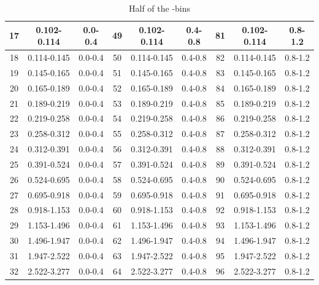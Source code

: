 \begin{table}[]
\begin{center}
\begin{tabular}{|c|c|c|c|c|c|c|c|c|}
 17 & 0.102-0.114 & 0.0-0.4 & 49 & 0.102-0.114 & 0.4-0.8 & 81 & 0.102-0.114 & 0.8-1.2 \\ \hline
 18 & 0.114-0.145 & 0.0-0.4 & 50 & 0.114-0.145 & 0.4-0.8 & 82 & 0.114-0.145 & 0.8-1.2 \\ \hline
 19 & 0.145-0.165 & 0.0-0.4 & 51 & 0.145-0.165 & 0.4-0.8 & 83 & 0.145-0.165 & 0.8-1.2 \\ \hline
 20 & 0.165-0.189 & 0.0-0.4 & 52 & 0.165-0.189 & 0.4-0.8 & 84 & 0.165-0.189 & 0.8-1.2 \\ \hline
 21 & 0.189-0.219 & 0.0-0.4 & 53 & 0.189-0.219 & 0.4-0.8 & 85 & 0.189-0.219 & 0.8-1.2 \\ \hline
 22 & 0.219-0.258 & 0.0-0.4 & 54 & 0.219-0.258 & 0.4-0.8 & 86 & 0.219-0.258 & 0.8-1.2 \\ \hline
 23 & 0.258-0.312 & 0.0-0.4 & 55 & 0.258-0.312 & 0.4-0.8 & 87 & 0.258-0.312 & 0.8-1.2 \\ \hline
 24 & 0.312-0.391 & 0.0-0.4 & 56 & 0.312-0.391 & 0.4-0.8 & 88 & 0.312-0.391 & 0.8-1.2 \\ \hline
 25 & 0.391-0.524 & 0.0-0.4 & 57 & 0.391-0.524 & 0.4-0.8 & 89 & 0.391-0.524 & 0.8-1.2 \\ \hline
 26 & 0.524-0.695 & 0.0-0.4 & 58 & 0.524-0.695 & 0.4-0.8 & 90 & 0.524-0.695 & 0.8-1.2 \\ \hline
 27 & 0.695-0.918 & 0.0-0.4 & 59 & 0.695-0.918 & 0.4-0.8 & 91 & 0.695-0.918 & 0.8-1.2 \\ \hline
 28 & 0.918-1.153 & 0.0-0.4 & 60 & 0.918-1.153 & 0.4-0.8 & 92 & 0.918-1.153 & 0.8-1.2 \\ \hline
 29 & 1.153-1.496 & 0.0-0.4 & 61 & 1.153-1.496 & 0.4-0.8 & 93 & 1.153-1.496 & 0.8-1.2 \\ \hline
 30 & 1.496-1.947 & 0.0-0.4 & 62 & 1.496-1.947 & 0.4-0.8 & 94 & 1.496-1.947 & 0.8-1.2 \\ \hline
 31 & 1.947-2.522 & 0.0-0.4 & 63 & 1.947-2.522 & 0.4-0.8 & 95 & 1.947-2.522 & 0.8-1.2 \\ \hline
 32 & 2.522-3.277 & 0.0-0.4 & 64 & 2.522-3.277 & 0.4-0.8 & 96 & 2.522-3.277 & 0.8-1.2 \\ \hline



\end{tabular}

\end{center}
\caption[Half of the 2D bins ]{ Half of the \phistar-\rapidity bins }
\label{table:phistarAndEtaBins1}
\end{table}


